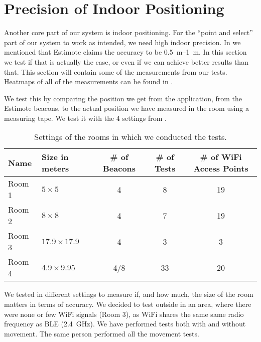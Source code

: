 \section{Precision of Indoor Positioning}\label{sec:estimoteprecision}
Another core part of our system is indoor positioning. 
For the ``point and select'' part of our system to work as intended, 
we need high indoor precision. 
In  we mentioned that Estimote claims the accuracy to be \SIrange{0.5}{1}{\meter}.
In this section we test if that is actually the case, 
or even if we can achieve better results than that. 
This section will contain some of the measurements from our tests. 
Heatmaps of all of the measurements can be found in .

We test this by comparing the position we get from the application, \ie from the Estimote beacons,
to the actual position we have measured in the room using a measuring tape.
We test it with the \num{4} settings from .

\begin{table}
  \centering
  \begin{tabular}{l| l c c c}
  	Name   & Size in meters     & \# of Beacons   & \# of Tests & \# of WiFi Access Points \\ \hline
  	Room 1 & $5 \times 5$       & \num{4}         & \num{8}     & \num{19}                 \\
  	Room 2 & $8 \times 8$       & \num{4}         & \num{7}     & \num{19}                 \\
  	Room 3 & $17.9 \times 17.9$ & \num{4}         & \num{3}     & \num{3}                  \\
  	Room 4 & $4.9 \times 9.95$  & \num{4}/\num{8} & \num{33}    & \num{20}
  \end{tabular}
  \caption{Settings of the rooms in which we conducted the tests.}
  \label{table:rooms}
\end{table}

We tested in different settings to measure if, and how much, 
the size of the room matters in terms of accuracy. 
We decided to test outside in an area, 
where there were none or few WiFi signals (Room 3),
as WiFi shares the same same radio frequency as BLE (\SI{2.4}{\GHz}). 
We have performed tests both with and without movement. 
The same person performed all the movement tests. 


